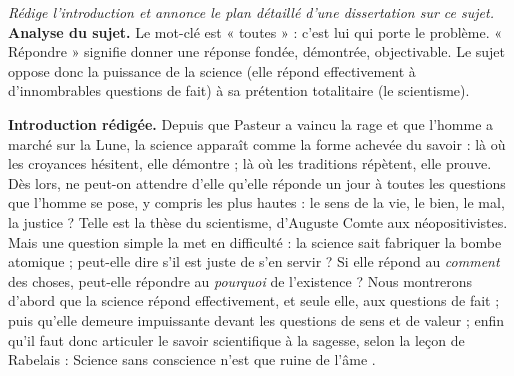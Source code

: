 \documentclass[11pt]{article}
\begin{document}
\begin{exoresolu}
\emph{Rédige l'introduction et annonce le plan détaillé d'une dissertation sur ce sujet.}
\tcblower
\textbf{Analyse du sujet.} Le mot-clé est « toutes » : c'est lui qui porte le problème. « Répondre » signifie donner une réponse fondée, démontrée, objectivable. Le sujet oppose donc la puissance de la science (elle répond effectivement à d'innombrables questions de fait) à sa prétention totalitaire (le scientisme).

\textbf{Introduction rédigée.} Depuis que Pasteur a vaincu la rage et que l'homme a marché sur la Lune, la science apparaît comme la forme achevée du savoir : là où les croyances hésitent, elle démontre ; là où les traditions répètent, elle prouve. Dès lors, ne peut-on attendre d'elle qu'elle réponde un jour à toutes les questions que l'homme se pose, y compris les plus hautes : le sens de la vie, le bien, le mal, la justice ? Telle est la thèse du scientisme, d'Auguste Comte aux néopositivistes. Mais une question simple la met en difficulté : la science sait fabriquer la bombe atomique ; peut-elle dire s'il est juste de s'en servir ? Si elle répond au \emph{comment} des choses, peut-elle répondre au \emph{pourquoi} de l'existence ? Nous montrerons d'abord que la science répond effectivement, et seule elle, aux questions de fait ; puis qu'elle demeure impuissante devant les questions de sens et de valeur ; enfin qu'il faut donc articuler le savoir scientifique à la sagesse, selon la leçon de Rabelais : \guillemotleft Science sans conscience n'est que ruine de l'âme \guillemotright.


\end{exoresolu}
\end{document}
